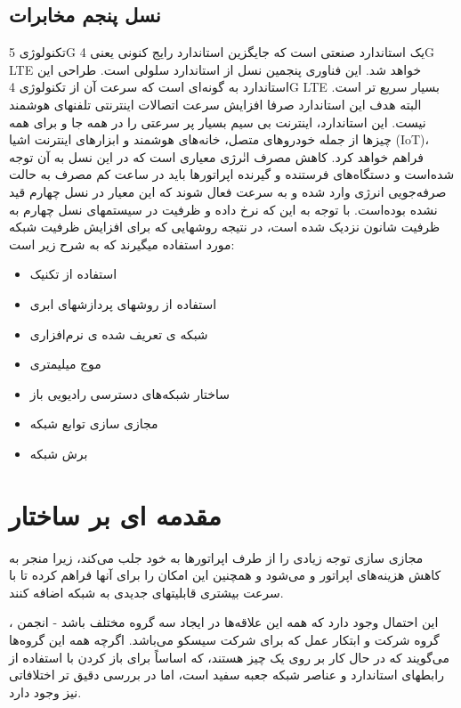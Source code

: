  \subsection{نسل پنجم مخابرات}
تکنولوژی 5G یک استاندارد صنعتی است که جایگزین استاندارد رایج کنونی یعنی 4G LTE خواهد شد. این فناوری پنجمین نسل از استاندارد سلولی است. طراحی این استاندارد به گونه‌ای است که سرعت آن از تکنولوژی 4G LTE بسیار سریع تر است. البته هدف این استاندارد صرفا افزایش سرعت اتصالات اینترنتی تلفنهای هوشمند نیست. این استاندارد، اینترنت بی سیم بسیار پر سرعتی را در همه جا و برای همه چیزها از جمله خودروهای متصل، خانه‌های هوشمند و ابزارهای اینترنت اشیا (IoT)، فراهم خواهد کرد. 
کاهش مصرف انٰرژی  معیاری است که در این نسل به آن توجه شده‌است و دستگاه‌های فرستنده و گیرنده اپراتورها باید در ساعت کم مصرف به حالت صرفه‌جویی انرژی وارد شده و به سرعت فعال شوند که این معیار در نسل چهارم قید نشده بوده‌است.
 با توجه
به این که نرخ داده و ظرفیت در سیستمهای نسل چهارم به ظرفیت
شانون نزدیک شده است، در نتیجه روشهایی که برای
افزایش ظرفیت شبکه مورد استفاده میگیرند که به شرح زیر است:
\begin{itemize}
\item
استفاده از تکنیک 
\item
استفاده از روشهای پردازشهای ابری
\item
شبکه ی تعریف شده ی نرم‌افزاری
\item
موج میلیمتری
\item 
ساختار شبکه‌های دسترسی رادیویی باز
\item 
مجازی سازی توابع شبکه
\item 
برش شبکه
\end{itemize}
\section{مقدمه ای بر ساختار }
مجازی سازی  توجه زیادی را از طرف اپراتورها به خود جلب می‌کند، زیرا منجر به کاهش هزینه‌های اپراتور و  می‌شود و همچنین این امکان را برای آنها فراهم کرده تا با سرعت بیشتری قابلیتهای جدیدی به شبکه اضافه کنند.

این احتمال وجود دارد که همه این علاقه‌ها در ایجاد سه گروه مختلف باشد -
 انجمن 
، گروه
  شرکت 
   و ابتکار عمل
که برای شرکت سیسکو می‌باشد.
اگرچه همه این گروه‌ها می‌گویند که در حال کار بر روی یک چیز هستند، که اساساً برای باز کردن  با استفاده از رابطهای استاندارد و عناصر شبکه جعبه سفید است، اما در بررسی دقیق تر اختلافاتی نیز وجود دارد.

